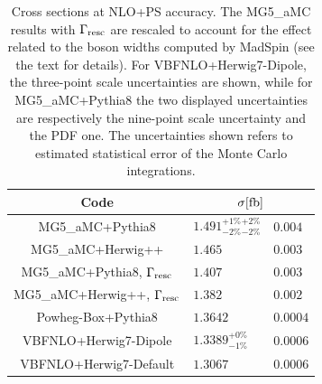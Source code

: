 \documentclass[twocolumn,epjc3]{svjour3} %
\newlength{\width}
\begin{document}
\begin{table}[h!]
    \centering
    \begin{tabular}{c|l@{ $\pm$ }l}
      Code  &  \multicolumn{2}{c}{$\sigma[\rm{fb}]$}  \\
        \hline\hline
        {\sc MG5\_aMC}+{\sc Pythia8}&  $1.491 ^{+1\%}_{-2\%} {}^{+2\%}_{-2\%} $ & $0.004$  \\
        {\sc MG5\_aMC}+{\sc Herwig++}&  $1.465 $ & $0.003$  \\
        {\sc MG5\_aMC}+{\sc Pythia8}, $\Gamma_{\rm resc}$&  $1.407$ & $0.003$  \\
        {\sc MG5\_aMC}+{\sc Herwig++}, $\Gamma_{\rm resc}$&  $1.382$ & $0.002$  \\
        {\sc Powheg-Box}+{\sc Pythia8}  & $1.3642$ & $0.0004$  \\
        {\sc VBFNLO}+{\sc Herwig7-Dipole} &  $1.3389 ^{+0\%}_{-1\%}$ & $0.0006$  \\
        {\sc VBFNLO}+{\sc Herwig7-Default} &  $1.3067$ & $0.0006$  \\
    \end{tabular}
    \caption{\label{tab:PSratesNLO} Cross sections at NLO+PS accuracy.
    The {\sc MG5\_aMC} results with $\Gamma_{\rm resc}$
    are rescaled to account for the effect related to the boson widths computed by {\sc MadSpin} (see the text for details). For
    {\sc VBFNLO}+{\sc Herwig7-Dipole}, the three-point scale uncertainties are shown, while for  {\sc MG5\_aMC}+{\sc Pythia8} the two displayed uncertainties
are respectively the nine-point scale uncertainty and the PDF one.
The uncertainties shown refers to estimated statistical error of the Monte Carlo integrations.}
\end{table}
\end{document}

